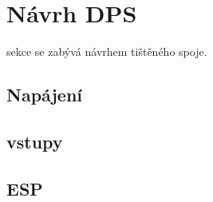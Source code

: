 \section{Návrh \acs{DPS}}

sekce se zabývá návrhem tištěného spoje. 

\subsection{Napájení}

\subsection{vstupy}

\subsection{ESP}